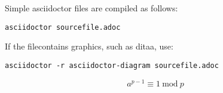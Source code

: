 Simple asciidoctor files are compiled as follows:


\begin{verbatim}
asciidoctor sourcefile.adoc
\end{verbatim}

If the filecontains graphics, such as ditaa, use:


\begin{verbatim}
asciidoctor -r asciidoctor-diagram sourcefile.adoc
\end{verbatim}

\begin{equation*}
a^{p-1} \equiv 1\ \text{mod}\ p
\end{equation*}

